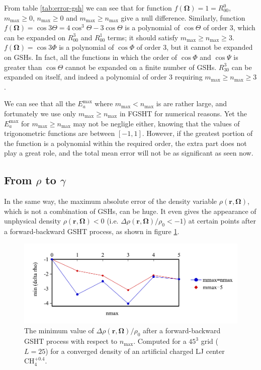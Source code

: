 From table \ref{tab:error-gsh} we can see that for function $f(\mathbf{\Omega})=1=R_{00}^{0}$,
$m_{\max}\geq0$, $n_{\max}\geq0$ and $m_{\max}\geq n_{\max}$ give
a null difference. Similarly, function $f(\mathbf{\Omega})=\cos3\Theta=4\cos^{3}\Theta-3\cos\Theta$
is a polynomial of $\cos\Theta$ of order 3, which can be expanded
on $R_{00}^{3}$ and $R_{00}^{1}$ terms; it should satisfy $m_{\max}\geq n_{\max}\geq3$.
$f(\mathbf{\Omega})=\cos3\Phi$ is a polynomial of $\cos\Phi$ of
order 3, but it cannot be expanded on \acs{GSH}s. In fact, all the
functions in which the order of $\cos\Phi$ and $\cos\Psi$ is greater
than $\cos\Theta$ cannot be expanded on a finite number of \acs{GSH}s.
$R_{30}^{3}$ can be expanded on itself, and indeed a polynomial of
order 3 requiring $m_{\max}\geq n_{\max}\geq3$.

We can see that all the $E_{a}^{\mathrm{max}}$ where $m_{\max}<n_{\max}$
is are rather large, and fortunately we use only $m_{\max}\geq n_{\max}$
in \acs{FGSHT} for numerical reasons. Yet the $E_{a}^{\mathrm{max}}$
for $m_{\max}\geq n_{\max}$ may not be negligle either, knowing that
the values of trigonometric functions are between $\left[-1,1\right]$.
However, if the greatest portion of the function is a polynomial within
the required order, the extra part does not play a great role, and the
total mean error will not be as significant as seen now. 

\subsection{From $\rho$ to $\gamma$}

In the same way, the maximum absolute error of the density variable
$\rho(\mathbf{r},\mathbf{\Omega})$, which is not a combination of
\acs{GSH}s, can be huge. It even gives the appearance of unphysical
density $\rho(\mathbf{r},\mathbf{\Omega})<0$ (i.e. $\Delta\rho(\mathbf{r},\mathbf{\Omega})/\rho_{0}<-1$)
at certain points after a forward-backward \acs{GSHT} process, as
shown in figure \ref{fig:unphysical-rho}.

\begin{figure}[h]
\begin{centering}
\includegraphics[bb=0bp 20bp 454bp 150bp,width=0.75\columnwidth]{_figure/results/min_delta_rho}
\par\end{centering}
\caption[The minimum value of $\Delta\rho(\mathbf{r},\mathbf{\Omega})/\rho_{0}$
after a forward-backward \acs{GSHT} process]{The minimum value of $\Delta\rho(\mathbf{r},\mathbf{\Omega})/\rho_{0}$
after a forward-backward \acs{GSHT} process with respect to $n_{\max}$.
Computed for a $45^{3}$ grid ($L=25$) for a converged density of
an artificial charged LJ center $\mathrm{CH}_{4}^{+0.4}$. \label{fig:unphysical-rho} }
\end{figure}

